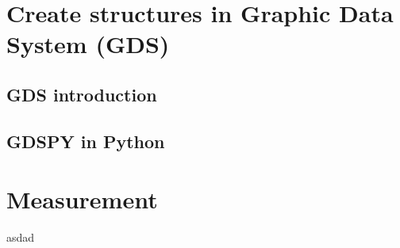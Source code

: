 \documentclass[]{article}
\begin{document}
\section{Create structures in Graphic Data System (GDS)}

\subsection{GDS introduction}

\subsection{GDSPY in Python}

\section{Measurement}

\newpage

\begin{thebibliography}{99}
asdad
\end{thebibliography}
\end{document}
